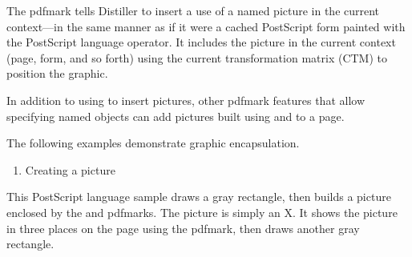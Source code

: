 \documentclass[letterpaper,12pt,english,openany,oneside]{sphinxmanual}
\begin{document}
The  pdfmark tells Distiller to insert a use of a named picture in the current context—in the same manner as if it were a cached PostScript form painted with the  PostScript language operator. It includes the picture in the current context (page, form, and so forth) using the current transformation matrix (CTM) to position the graphic.

In addition to using  to insert pictures, other pdfmark features that allow specifying named objects can add pictures built using  and  to a page.

The following examples demonstrate graphic encapsulation.
\begin{enumerate}
%
\item {} 
Creating a picture

\end{enumerate}

This PostScript language sample draws a gray rectangle, then builds a picture enclosed by the  and  pdfmarks. The picture is simply an X. It shows the picture in three places on the page using the  pdfmark, then draws another gray rectangle.
\end{document}
